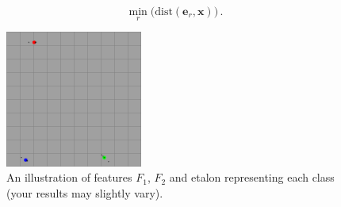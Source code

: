 \documentclass[12pt]{article}
\begin{document}
\begin{equation}
    \min\limits_{r} \big( \text{dist} \left( \mathbf{e}_r, \mathbf{x} \right) \big) \, .
\end{equation}


\begin{figure}[t]
\begin{centering}
\includegraphics[width=0.4\textwidth]{feature_space.png}
\caption{An illustration of features $F_1$, $F_2$ and etalon representing each class (your results may slightly vary).}
\end{centering}
\label{fig:features_viz}
\end{figure}
\end{document}
